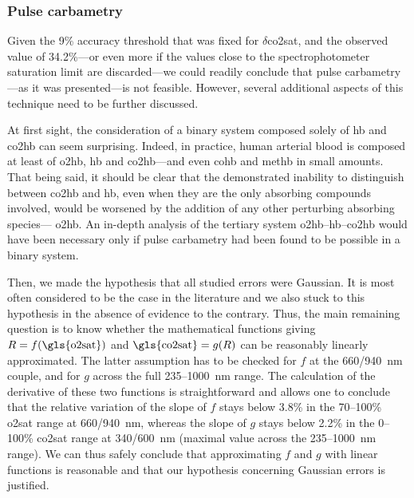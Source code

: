 \subsubsection{Pulse carbametry}

Given the 9\% accuracy threshold that was fixed for $\delta$\gls{co2sat}, and the observed value of 34.2\%---or even more if the values close to the spectrophotometer saturation limit are discarded---we could readily conclude that pulse carbametry---as it was presented---is not feasible. However, several additional aspects of this technique need to be further discussed.

At first sight, the consideration of a binary system composed solely of \gls{hb} and \gls{co2hb} can seem surprising. Indeed, in practice, human arterial blood is composed at least of \gls{o2hb}, \gls{hb} and \gls{co2hb}---and even \gls{cohb}\cite{mcilvaine1969, wald1981} and \gls{methb}\cite{kravitz1956, vankampen1966} in small amounts. That being said, it should be clear that the demonstrated inability to distinguish between \gls{co2hb} and \gls{hb}, even when they are the only absorbing compounds involved, would be worsened by the addition of any other perturbing absorbing species---\eg{} \gls{o2hb}. An in-depth analysis of the tertiary system \gls{o2hb}--\gls{hb}--\gls{co2hb} would have been necessary only if pulse carbametry had been found to be possible in a binary system.

Then, we made the hypothesis that all studied errors were Gaussian. It is most often considered to be the case in the literature\cite{nitzan2014, jubran2015} and we also stuck to this hypothesis in the absence of evidence to the contrary. Thus, the main remaining question is to know whether the mathematical functions giving $R = f(\text{\gls{o2sat}})$ and $\text{\gls{co2sat}} = g(R)$ can be reasonably linearly approximated. The latter assumption has to be checked for $f$ at the 660/940~nm couple, and for $g$ across the full 235--1000~nm range. The calculation of the derivative of these two functions is straightforward and allows one to conclude that the relative variation of the slope of $f$ stays below 3.8\% in the 70--100\% \gls{o2sat} range at 660/940~nm, whereas the slope of $g$ stays below 2.2\% in the 0--100\% \gls{co2sat} range at 340/600~nm (maximal value across the 235--1000~nm range). We can thus safely conclude that approximating $f$ and $g$ with linear functions is reasonable and that our hypothesis concerning Gaussian errors is justified.

